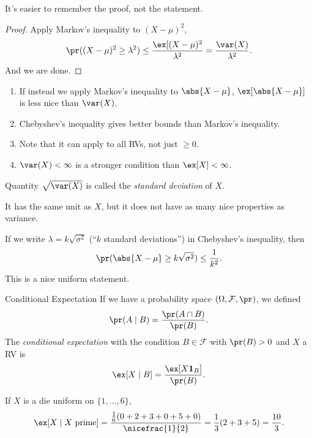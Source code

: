 \begin{remark}
    It's easier to remember the proof, not the statement.
\end{remark}
\begin{proof}
    Apply Markov's inequality to \((X - \mu)^2\),
    \[
        \pr((X - \mu)^2 \geq \lambda^2) \leq \frac{\ex[(X- \mu)^2}{\lambda^2} = \frac{\var(X)}{\lambda^2}.
    \]
    And we are done.
\end{proof}
\begin{remark}
    \begin{enumerate}
        \item If instead we apply Markov's inequality to \(\abs{X - \mu}\), \(\ex[\abs{X - \mu}]\) is less nice than \(\var(X)\).
        \item Chebyshev's inequality gives better bounds than Markov's inequality.
        \item Note that it can apply to all RVs, not just \(\geq 0\).
        \item \(\var(X) < \infty\) is a stronger condition than \(\ex[X] < \infty\).
    \end{enumerate}
\end{remark}
\begin{definition}{}{}
    Quantity \(\sqrt{\var(X)}\) is called the \textit{standard deviation} of \(X\).
\end{definition}
\begin{remark}
    It has the same unit as \(X\), but it does not have as many nice properties as variance.
\end{remark}
If we write \(\lambda = k \sqrt{\sigma^2}\) (``\(k\) standard deviations'') in Chebyshev's inequality, then
\[
    \pr(\abs{X - \mu} \geq k \sqrt{\sigma^2}) \leq \frac{1}{k^2}.
\]
This is a nice uniform statement.
\begin{definition}{Conditional Expectation}{}
    If we have a probability space \((\Omega, \mathcal{F}, \pr)\), we defined
    \[
        \pr(A \mid B) = \frac{\pr(A\cap B)}{\pr(B)}.
    \]
    The \textit{conditional expectation} with the condition \(B \in \mathcal{F}\) with \(\pr(B) > 0\) and \(X\) a RV is
    \[
        \ex[X \mid B] = \frac{\ex[X \textbf{1}_{B}]}{\pr(B)}.
    \]
\end{definition}
\begin{example}
    If \(X\) is a die uniform on \(\{1, \dots, 6\}\),
    \[
        \ex[X \mid X \text{ prime}] = \frac{\frac{1}{6}(0 + 2 + 3 + 0 + 5 + 0)}{\nicefrac{1}{2}} = \frac{1}{3}(2 + 3 + 5) = \frac{10}{3}.
    \]
\end{example}
